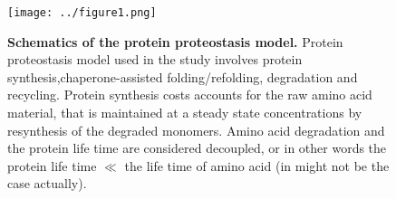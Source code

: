 \documentclass[10pt,letterpaper]{article}
\begin{document}
\begin{figure}[h!]
\texttt{[image: ../figure1.png]}
\caption{
{\bf Schematics of the protein proteostasis model.}  Protein proteostasis model used in the study involves protein synthesis,chaperone-assisted folding/refolding, degradation and recycling. Protein synthesis costs accounts for the raw amino acid material, that is maintained at a steady state concentrations by resynthesis of the degraded monomers. Amino acid degradation and the protein life time are considered decoupled, or in other words the protein life time $\ll$ the life time of amino acid (in might not be the case actually).  
}
\label{fig:fig1}
\end{figure}
\end{document}
